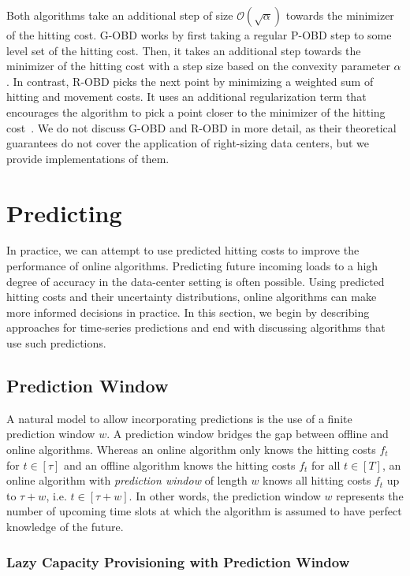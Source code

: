 Both algorithms take an additional step of size $\mathcal{O}(\sqrt{\alpha})$ towards the minimizer of the hitting cost. G-OBD works by first taking a regular P-OBD step to some level set of the hitting cost. Then, it takes an additional step towards the minimizer of the hitting cost with a step size based on the convexity parameter $\alpha$. In contrast, R-OBD picks the next point by minimizing a weighted sum of hitting and movement costs. It uses an additional regularization term that encourages the algorithm to pick a point closer to the minimizer of the hitting cost~\cite{Goel2019}. We do not discuss G-OBD and R-OBD in more detail, as their theoretical guarantees do not cover the application of right-sizing data centers, but we provide implementations of them.

\section{Predicting}\label{section:online_algorithms:md:predictions}

In practice, we can attempt to use predicted hitting costs to improve the performance of online algorithms. Predicting future incoming loads to a high degree of accuracy in the data-center setting is often possible. Using predicted hitting costs and their uncertainty distributions, online algorithms can make more informed decisions in practice. In this section, we begin by describing approaches for time-series predictions and end with discussing algorithms that use such predictions.

\subsection{Prediction Window}

A natural model to allow incorporating predictions is the use of a finite prediction window $w$. A prediction window bridges the gap between offline and online algorithms. Whereas an online algorithm only knows the hitting costs $f_t$ for $t \in [\tau]$ and an offline algorithm knows the hitting costs $f_t$ for all $t \in [T]$, an online algorithm with \emph{prediction window} of length $w$ knows all hitting costs $f_t$ up to $\tau + w$, i.e. $t \in [\tau + w]$. In other words, the prediction window $w$ represents the number of upcoming time slots at which the algorithm is assumed to have perfect knowledge of the future.

\subsubsection{Lazy Capacity Provisioning with Prediction Window}

